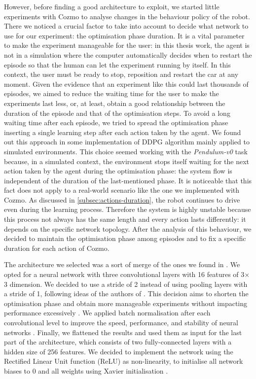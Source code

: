 However, before finding a good architecture to exploit, we started little experiments with Cozmo to analyse changes in the behaviour policy of the robot.
There we noticed a crucial factor to take into account to decide what network to use for our experiment: the optimisation phase duration.
It is a vital parameter to make the experiment manageable for the user: in this thesis work, the agent is not in a simulation where the computer automatically decides when to restart the episode so that the human can let the experiment running by itself.
In this context, the user must be ready to stop, reposition and restart the car at any moment.
Given the evidence that an experiment like this could last thousands of episodes, we aimed to reduce the waiting time for the user to make the experiments last less, or, at least, obtain a good relationship between the duration of the episode and that of the optimisation steps.
To avoid a long waiting time after each episode, we tried to spread the optimisation phase inserting a single learning step after each action taken by the agent.
We found out this approach in some implementation of DDPG algorithm mainly applied to simulated environments.
This choice seemed working with the \textit{Pendulum-v0} task because, in a simulated context, the environment stops itself waiting for the next action taken by the agent during the optimisation phase: the system flow is independent of the duration of the last-mentioned phase.
It is noticeable that this fact does not apply to a real-world scenario like the one we implemented with Cozmo.
As discussed in \vref{subsec:actions-duration}, the robot continues to drive even during the learning process.
Therefore the system is highly unstable because this process not always has the same length and every action lasts differently: it depends on the specific network topology.
After the analysis of this behaviour, we decided to maintain the optimisation phase among episodes and to fix a specific duration for each action of Cozmo.

The architecture we selected was a sort of merge of the ones we found in \cite{kendall2018learning,kendall2019learning,haarnoja2018alg}.
We opted for a neural network with three convolutional layers with 16 features of 3$\times$3 dimension.
We decided to use a stride of 2 instead of using pooling layers with a stride of 1, following ideas of the authors of \cite{kendall2018learning,kendall2019learning}.
This decision aims to shorten the optimisation phase and obtain more manageable experiments without impacting performance excessively \cite{springenberg2014striving}.
We applied batch normalisation after each convolutional level to improve the speed, performance, and stability of neural networks \cite{ioffe2015batch}.
Finally, we flattened the results and used them as input for the last part of the architecture, which consists of two fully-connected layers with a hidden size of 256 features.
We decided to implement the network using the Rectified Linear Unit function (ReLU) as non-linearity, to initialise all network biases to 0 and all weights using Xavier initialisation \cite{glorot2010understanding}.

